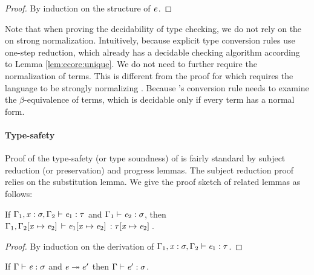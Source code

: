 \begin{proof}
	By induction on the structure of $\mathit{e}$.
\end{proof}

Note that when proving the decidability of type checking, we do not rely on the
on strong normalization. Intuitively, because explicit type conversion rules use one-step
reduction, which already has a decidable checking algorithm according to Lemma
\ref{lem:ecore:unique}. We do not need to further require the normalization of
terms. This is different from the proof for \cc which requires the
language to be strongly
normalizing \cite{pts:normalize}. Because \cc's conversion rule needs to
examine the $\beta$-equivalence of terms, which is decidable only if every term
has a normal form.

\paragraph{Type-safety}
Proof of the type-safety (or type soundness) of \ecore is fairly standard by subject
reduction (or preservation) and progress lemmas. The subject reduction proof
relies on the substitution lemma. We give the proof sketch of related lemmas as
follows:

\begin{lem}[Substitution]\label{lem:ecore:subst}
	If $\Gamma_{{\mathrm{1}}}  ,  \mathit{x}  :  \sigma  ,  \Gamma_{{\mathrm{2}}}  \vdash  \mathit{e_{{\mathrm{1}}}}  :  \tau$ and $\Gamma_{{\mathrm{1}}}  \vdash  \mathit{e_{{\mathrm{2}}}}  :  \sigma$, then $\Gamma_{{\mathrm{1}}}  ,  \Gamma_{{\mathrm{2}}}  [  \mathit{x}  \mapsto  \mathit{e_{{\mathrm{2}}}}  ] \,  \vdash  \mathit{e_{{\mathrm{1}}}}  [  \mathit{x}  \mapsto  \mathit{e_{{\mathrm{2}}}}  ] \,  :  \tau  [  \mathit{x}  \mapsto  \mathit{e_{{\mathrm{2}}}}  ] \,$.
\end{lem}

\begin{proof}
    By induction on the derivation of $\Gamma_{{\mathrm{1}}}  ,  \mathit{x}  :  \sigma  ,  \Gamma_{{\mathrm{2}}}  \vdash  \mathit{e_{{\mathrm{1}}}}  :  \tau$.
\end{proof}

\begin{thm}\label{lem:ecore:reduct}
If $\Gamma  \vdash  \mathit{e}  :  \sigma$ and $\mathit{e}  \twoheadrightarrow  e'$ then $\Gamma  \vdash  \mathit{e'}  :  \sigma$.
\end{thm}

